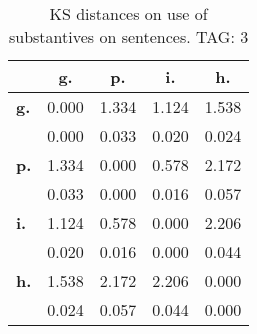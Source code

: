 \begin{table}[h!]
\begin{center}
\begin{tabular}{| l || c | c | c | c |}\hline
 & {\bf g.} & {\bf p.} & {\bf i.} & {\bf h.} \\\hline\hline
{\bf g.} & 0.000 & 1.334 & 1.124 & 1.538 \\
{\bf } & 0.000 & 0.033 & 0.020 & 0.024 \\\hline
{\bf p.} & 1.334 & 0.000 & 0.578 & 2.172 \\
{\bf } & 0.033 & 0.000 & 0.016 & 0.057 \\\hline
{\bf i.} & 1.124 & 0.578 & 0.000 & 2.206 \\
{\bf } & 0.020 & 0.016 & 0.000 & 0.044 \\\hline
{\bf h.} & 1.538 & 2.172 & 2.206 & 0.000 \\
{\bf } & 0.024 & 0.057 & 0.044 & 0.000 \\\hline
\end{tabular}
\caption{KS distances on use of substantives on sentences. TAG: 3}
\end{center}
\end{table}